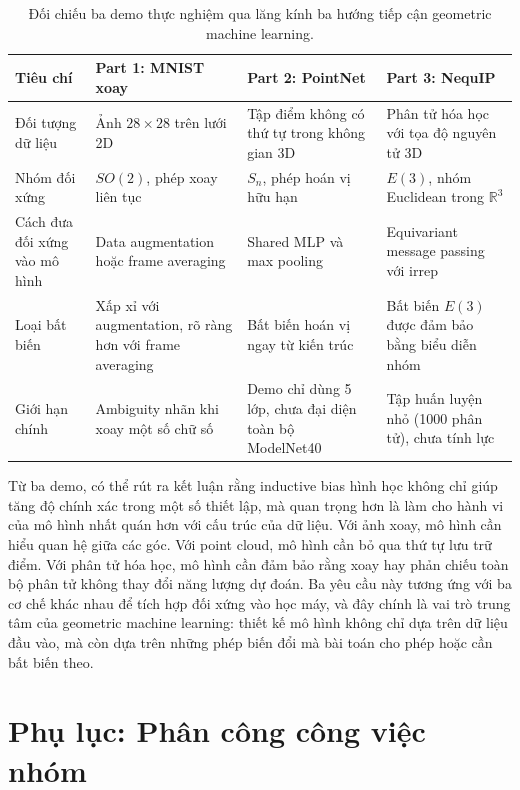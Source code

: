 \begin{table}[H]
\centering
\small
\renewcommand{\arraystretch}{1.3}
\caption{Đối chiếu ba demo thực nghiệm qua lăng kính ba hướng tiếp cận geometric machine learning.}
\label{tab:demo-lien-ket}
\begin{tabularx}{\textwidth}{p{}>{\raggedright\arraybackslash}X>{\raggedright\arraybackslash}X>{\raggedright\arraybackslash}X}
\toprule
\rowcolor{gray!20}
\textbf{Tiêu chí} & \textbf{Part 1: MNIST xoay} & \textbf{Part 2: PointNet} & \textbf{Part 3: NequIP} \\
\midrule
Đối tượng dữ liệu & Ảnh $28\times28$ trên lưới 2D & Tập điểm không có thứ tự trong không gian 3D & Phân tử hóa học với tọa độ nguyên tử 3D \\
Nhóm đối xứng & $SO(2)$, phép xoay liên tục & $S_n$, phép hoán vị hữu hạn & $E(3)$, nhóm Euclidean trong $\mathbb{R}^3$ \\
Cách đưa đối xứng vào mô hình & Data augmentation hoặc frame averaging & Shared MLP và max pooling & Equivariant message passing với irrep \\
Loại bất biến & Xấp xỉ với augmentation, rõ ràng hơn với frame averaging & Bất biến hoán vị ngay từ kiến trúc & Bất biến $E(3)$ được đảm bảo bằng biểu diễn nhóm \\
Giới hạn chính & Ambiguity nhãn khi xoay một số chữ số & Demo chỉ dùng 5 lớp, chưa đại diện toàn bộ ModelNet40 & Tập huấn luyện nhỏ (1000 phân tử), chưa tính lực \\
\bottomrule
\end{tabularx}
\end{table}

Từ ba demo, có thể rút ra kết luận rằng inductive bias hình học không chỉ giúp tăng độ chính xác trong một số thiết lập, mà quan trọng hơn là làm cho hành vi của mô hình nhất quán hơn với cấu trúc của dữ liệu. Với ảnh xoay, mô hình cần hiểu quan hệ giữa các góc. Với point cloud, mô hình cần bỏ qua thứ tự lưu trữ điểm. Với phân tử hóa học, mô hình cần đảm bảo rằng xoay hay phản chiếu toàn bộ phân tử không thay đổi năng lượng dự đoán. Ba yêu cầu này tương ứng với ba cơ chế khác nhau để tích hợp đối xứng vào học máy, và đây chính là vai trò trung tâm của geometric machine learning: thiết kế mô hình không chỉ dựa trên dữ liệu đầu vào, mà còn dựa trên những phép biến đổi mà bài toán cho phép hoặc cần bất biến theo.

\clearpage

\section*{Phụ lục: Phân công công việc nhóm}

